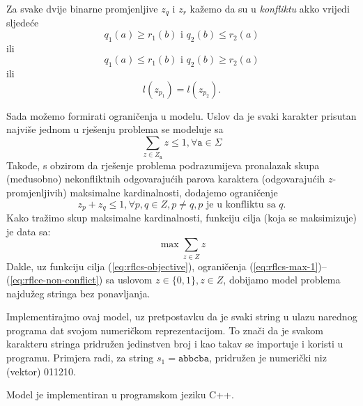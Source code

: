 \documentclass[b5paper, utf8, 11pt, colorlinks]{book}
\theoremstyle{definition}
\begin{document}
Za svake dvije binarne promjenljive $z_{q}$ i $z_{r}$ kažemo da su u \emph{konfliktu} akko vrijedi sljedeće
 $$ q_1(a) \geq r_1(b) \mbox{ i } q_2(b) \leq r_2(a) $$ 
ili 
 $$ q_1(a) \leq r_1(b) \mbox{ i } q_2(b) \geq r_2(a)$$ 
ili 
$$ l(z_{p_1}) = l(z_{p_2}).$$

Sada možemo formirati ograničenja u modelu. Uslov da je svaki karakter prisutan najviše jednom u rješenju problema se modeluje sa 
\begin{equation}\label{eq:rflcs-max-1}
	 \sum_{z \in  Z_{\texttt{a} }} z \leq 1, \forall \texttt{a} \in \Sigma 
\end{equation}
Takođe, s obzirom da rješenje problema podrazumijeva pronalazak skupa (međusobno) nekonfliktnih odgovarajućih parova karaktera (odgovarajućih $z$-promjenljivih) maksimalne kardinalnosti, dodajemo ograničenje
\begin{equation}\label{eq:rflce-non-conflict}
	 z_{p} + z_q \leq 1, \forall p,q \in Z, p\neq q, p\mbox{ je u konfliktu sa } q.
\end{equation}
Kako tražimo skup maksimalne kardinalnosti, funkciju cilja (koja se maksimizuje) je data sa:
\begin{equation}\label{eq:rflcs-objective}
	 \max \sum_{z \in Z } z 
\end{equation}
Dakle, uz funkciju cilja (\ref{eq:rflcs-objective}), ograničenja (\ref{eq:rflcs-max-1})--(\ref{eq:rflce-non-conflict}) sa uslovom $z \in \{0, 1\}, z \in Z$, dobijamo model problema najdužeg stringa bez ponavljanja. 

 Implementirajmo ovaj model, uz pretpostavku da je svaki string u ulazu narednog programa dat svojom numeričkom reprezentacijom. To znači da je svakom karakteru stringa pridružen jedinstven broj i kao takav se importuje i koristi u programu. Primjera radi, za string $s_1=\texttt{abbcba}$, pridružen je numerički niz (vektor) 011210.
 
 Model je implementiran u programskom jeziku C++. %
 
\end{document}
